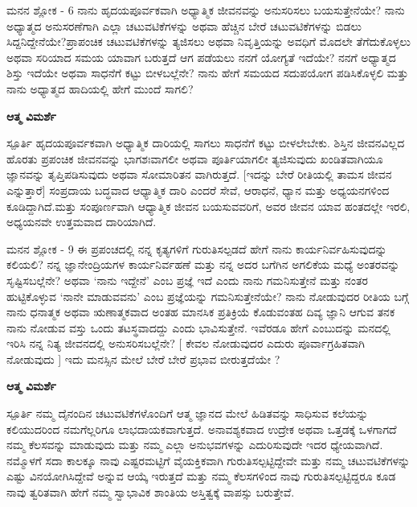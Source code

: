 \newpage
\begin{mananam}{\mananamfont ಮನನ ಶ್ಲೋಕ - \textenglish{6}}
\footnotesize \mananamtext ನಾನು ಹೃದಯಪೂರ್ವಕವಾಗಿ ಅಧ್ಯಾತ್ಮಿಕ ಜೀವನವನ್ನು ಅನುಸರಿಸಲು ಬಯಸುತ್ತೇನೆಯೇ? ನಾನು ಅಧ್ಯಾತ್ಮದ ಅನುಸರಣೆಗಾಗಿ ಎಲ್ಲಾ ಚಟುವಟಿಕೆಗಳನ್ನು ಅಥವಾ ಹೆಚ್ಚಿನ ಬೇರೆ ಚಟುವಟಿಕೆಗಳನ್ನು ಬಿಡಲು ಸಿದ್ದನಿದ್ದೇನೆಯೇ?ಪ್ರಾಪಂಚಿಕ ಚಟುವಟಿಕೆಗಳನ್ನು ತ್ಯಜಿಸಲು ಅಥವಾ ನಿವೃತ್ತಿಯನ್ನು ಅವಧಿಗೆ ಮೊದಲೇ ತೆಗೆದುಕೊಳ್ಳಲು ಅಥವಾ ಸರಿಯಾದ ಸಮಯ ಯಾವಾಗ ಬರುತ್ತದೆ ಆಗ ಪಡೆಯಲು ನನಗೆ ಯೋಗ್ಯತೆ ಇದೆಯೇ? ನನಗೆ ಅಧ್ಯಾತ್ಮದ ಶಿಸ್ತು ಇದೆಯೇ ಅಥವಾ ಸಾಧನೆಗೆ ಕಟ್ಟು ಬೀಳಬಲ್ಲೆನೇ? ನಾನು ಹೇಗೆ ಸಮಯದ ಸದುಪಯೋಗ ಪಡಿಸಿಕೊಳ್ಳಲಿ ಮತ್ತು ನಾನು ಅಧ್ಯಾತ್ಮದ ಹಾದಿಯಲ್ಲಿ ಹೇಗೆ ಮುಂದೆ ಸಾಗಲಿ?\\
\end{mananam}
\WritingHand\enspace\textbf{ಆತ್ಮ ವಿಮರ್ಶೆ}\\
\begin{inspiration}{\mananamfont ಸ್ಪೂರ್ತಿ}
\footnotesize \mananamtext ಹೃದಯಪೂರ್ವಕವಾಗಿ ಅಧ್ಯಾತ್ಮಿಕ ದಾರಿಯಲ್ಲಿ ಸಾಗಲು ಸಾಧನೆಗೆ ಕಟ್ಟು ಬೀಳಲೇಬೇಕು. ಶಿಸ್ತಿನ ಜೀವನವಿಲ್ಲದ ಹೊರತು ಪ್ರಪಂಚಿಕ ಜೀವನವನ್ನು ಭಾಗಶಃವಾಗಲೀ ಅಥವಾ ಪೂರ್ತಿಯಾಗಲೀ ತ್ಯಜಿಸುವುದು ಖಂಡಿತವಾಗಿಯೂ ಜ್ಞಾನವನ್ನು ತೃಪ್ತಿಪಡಿಸುವುದು ಅಥವಾ ಸೋಮಾರಿತನ ವಾಗಿರುತ್ತದೆ. [ಇದನ್ನು ಬೇರೆ ರೀತಿಯಲ್ಲಿ ತಾಮಸ ಜೀವನ ಎನ್ನುತ್ತಾರೆ] ಸಂಪ್ರದಾಯ ಬದ್ಧವಾದ ಆಧ್ಯಾತ್ಮಿಕ ದಾರಿ ಎಂದರೆ ಸೇವೆ, ಆರಾಧನೆ, ಧ್ಯಾನ ಮತ್ತು ಅಧ್ಯಯನಗಳಿಂದ ಕೂಡಿದ್ದಾಗಿದೆ.ಮತ್ತು ಸಂಪೂರ್ಣವಾಗಿ ಆಧ್ಯಾತ್ಮಿಕ ಜೀವನ ಬಯಸುವವರಿಗೆ, ಅವರ ಜೀವನ ಯಾವ ಹಂತದಲ್ಲೇ ಇರಲಿ, ಅಧ್ಯಯನವೇ ಉತ್ತಮವಾದ ದಾರಿಯಾಗಿದೆ.
\end{inspiration}
\newpage

\begin{mananam}{\mananamfont ಮನನ ಶ್ಲೋಕ - \textenglish{9}}
\footnotesize \mananamtext ಈ ಪ್ರಪಂಚದಲ್ಲಿ ನನ್ನ ಕೃತ್ಯಗಳಿಗೆ ಗುರುತಿಸಲ್ಪಡದೆ ಹೇಗೆ ನಾನು ಕಾರ್ಯನಿರ್ವಹಿಸುವುದನ್ನು ಕಲಿಯಲಿ? ನನ್ನ ಜ್ಞಾನೇಂದ್ರಿಯಗಳ ಕಾರ್ಯನಿರ್ವಹಣೆ ಮತ್ತು ನನ್ನ ಅದರ ಬಗೆಗಿನ ಅಗಲಿಕೆಯ ಮಧ್ಯೆ ಅಂತರವನ್ನು ಸೃಷ್ಟಿಸಬಲ್ಲೆನೇ? ಅಥವಾ ‘ನಾನು ಇದ್ದೇನೆ’ ಎಂಬ ಪ್ರಜ್ಞೆ ಇದೆ ಎಂದು ನಾನು ಗಮನಿಸುತ್ತೇನೆ ಮತ್ತು ನಂತರ ಹುಟ್ಟಿಕೊಳ್ಳುವ ‘ನಾನೇ ಮಾಡುವವನು’ ಎಂಬ ಪ್ರಜ್ಞೆಯನ್ನು ಗಮನಿಸುತ್ತೇನೆಯೇ? ನಾನು ನೋಡುವುದರ ರೀತಿಯ ಬಗ್ಗೆ ನಾನು ಧನಾತ್ಮಕ ಅಥವಾ ಋಣಾತ್ಮಕವಾದ ಅಂತಹ ಮಾನಸಿಕ ಪ್ರತಿಕ್ರಿಯೆ ಕೊಡುವಂತಹ ದಿವ್ಯ ಜ್ಞಾನಿ ಆಗುವ ತನಕ ನಾನು ನೋಡುವ ವಸ್ತು ಒಂದು ತಟಸ್ಥವಾದದ್ದು  ಎಂದು ಭಾವಿಸುತ್ತೇನೆ. ಇವೆರಡೂ ಹೇಗೆ ಎಂಬುದನ್ನು ಮನದಲ್ಲಿ ಇರಿಸಿ ನನ್ನ ನಿತ್ಯ ಜೀವನದಲ್ಲಿ ಅನುಸರಿಸಬಲ್ಲೆನೇ? [ ಕೇವಲ ನೋಡುವುದರ ಎದುರು ಪೂರ್ವಾಗ್ರಹಿತವಾಗಿ ನೋಡುವುದು ] ಇದು ಮನಸ್ಸಿನ ಮೇಲೆ ಬೇರೆ ಬೇರೆ ಪ್ರಭಾವ ಬೀರುತ್ತದೆಯೇ ?
\end{mananam}
\WritingHand\enspace\textbf{ಆತ್ಮ ವಿಮರ್ಶೆ}\\
\begin{inspiration}{\mananamfont ಸ್ಪೂರ್ತಿ}
\footnotesize \mananamtext ನಮ್ಮ ದೈನಂದಿನ ಚಟುವಟಿಕೆಗಳೊಂದಿಗೆ ಆತ್ಮ ಜ್ಞಾನದ ಮೇಲೆ ಹಿಡಿತವನ್ನು ಸಾಧಿಸುವ ಕಲೆಯನ್ನು ಕಲಿಯುದರಿಂದ ನಮಗೆಲ್ಲರಿಗೂ ಲಾಭದಾಯಕವಾಗುತ್ತದೆ. ಅನಾವಶ್ಯಕವಾದ ಉದ್ರೇಕ ಅಥವಾ ಒತ್ತಡಕ್ಕೆ ಒಳಗಾಗದೆ ನಮ್ಮ ಕೆಲಸವನ್ನು ಮಾಡುವುದು ಮತ್ತು ನಮ್ಮ ಎಲ್ಲಾ ಅನುಭವಗಳನ್ನು ಎದುರಿಸುವುದೇ ಇದರ ಧ್ಯೇಯವಾಗಿದೆ. ನಮ್ಮೊಳಗೆ ಸದಾ ಕಾಲಕ್ಕೂ ನಾವು ಎಷ್ಟರಮಟ್ಟಿಗೆ ವೈಯಕ್ತಿಕವಾಗಿ ಗುರುತಿಸಲ್ಪಟ್ಟಿದ್ದೇವೇ ಮತ್ತು ನಮ್ಮ ಚಟುವಟಿಕೆಗಳನ್ನು ಎಷ್ಟು ವಿನಯೋಗಿಸಿದ್ದೇವೆ ಅನ್ನುವ ಆಯ್ಕೆ ಇರುತ್ತದೆ ಮತ್ತು ನಮ್ಮ ಕೆಲಸಗಳಿಂದ ನಾವು ಗುರುತಿಸಲ್ಪಟ್ಟಿದ್ದರೂ ಕೂಡ ನಾವು ತ್ವರಿತವಾಗಿ ಹೇಗೆ ನಮ್ಮ ಸ್ವಾಭಾವಿಕ ಶಾಂತಿಯ ಅಸ್ತಿತ್ವಕ್ಕೆ ವಾಪಸ್ಸು ಬರುತ್ತೇವೆ.
\end{inspiration}
\newpage


